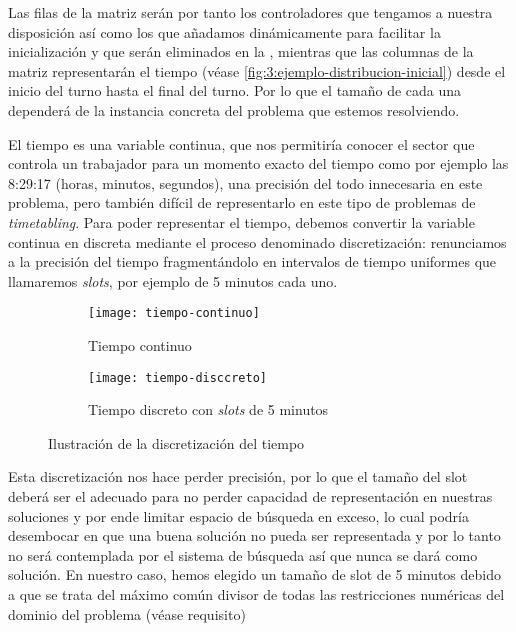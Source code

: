 Las filas de la matriz serán por tanto los controladores que tengamos a nuestra disposición así como los que añadamos dinámicamente para facilitar la inicialización y que serán eliminados en la \fasedos{}, mientras que las columnas de la matriz representarán el tiempo (véase \autoref{fig:3:ejemplo-distribucion-inicial}) desde el inicio del turno hasta el final del turno. Por lo que el tamaño de cada una dependerá de la instancia concreta del problema que estemos 
resolviendo.

El tiempo es una variable continua, que nos permitiría conocer el sector que controla un trabajador para un momento exacto del tiempo como por ejemplo las 8:29:17 (horas, minutos, segundos), una precisión del todo innecesaria en este problema, pero también difícil de representarlo en este tipo de problemas de \textit{timetabling}. Para poder 
representar el tiempo, debemos convertir la variable continua en discreta mediante el proceso denominado 
discretización: renunciamos a la precisión del tiempo fragmentándolo en intervalos de tiempo uniformes que llamaremos \textit{slots}, por ejemplo de 5 minutos cada uno.

\begin{figure}[htbp]
	\begin{subfigure}{\linewidth}
		\centering
		\texttt{[image: tiempo-continuo]}
		\caption{Tiempo continuo}
		\label{fig:timepo-continuo}
	\end{subfigure}
	
	\begin{subfigure}{\linewidth}
		\centering
		\texttt{[image: tiempo-disccreto]}
		\caption{Tiempo discreto con \textit{slots} de 5 minutos}
		\label{fig:timepo-disccreto}
	\end{subfigure}
	
	\caption{Ilustración de la discretización del tiempo}
\end{figure}

Esta discretización nos hace perder precisión, por lo que el tamaño del slot deberá ser el adecuado para no perder capacidad de representación en nuestras soluciones y por ende limitar espacio de búsqueda en exceso, lo cual podría desembocar en que una buena solución no pueda ser representada y por lo tanto no será contemplada por el sistema de búsqueda así que nunca se dará como solución.
En nuestro caso, hemos elegido un tamaño de slot de 5 minutos debido a que se trata del máximo común divisor de todas las restricciones numéricas del dominio del problema (véase requisito) %

